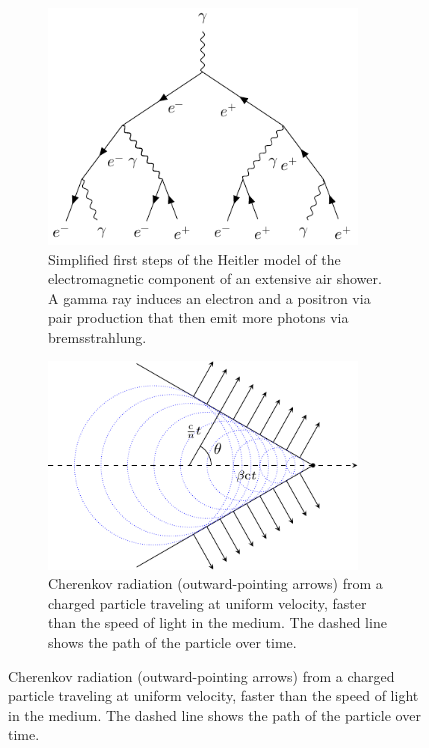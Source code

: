 \begin{figure}
    \begin{subfigure}[t]{0.45\textwidth}
        \centering
        \includegraphics[width=0.90\textwidth]{graphics/heitler_model.pdf}
        \caption{Simplified first steps of the Heitler model of the electromagnetic component of an extensive air shower.
        A gamma ray induces an electron and a positron via pair production that then emit more photons
        via bremsstrahlung.}
        \label{fig:heitler_model}
    \end{subfigure}
    \hfill
    \begin{subfigure}[t]{0.45\textwidth}
        \centering
        \includegraphics[width=0.90\textwidth]{graphics/cherenkov_radiation.pdf}
        \caption{Cherenkov radiation (outward-pointing arrows) from a charged particle traveling at
        uniform velocity, faster than the speed of light in the medium. The dashed line shows the
        path of the particle over time.}

\end{subfigure}
\end{figure}
